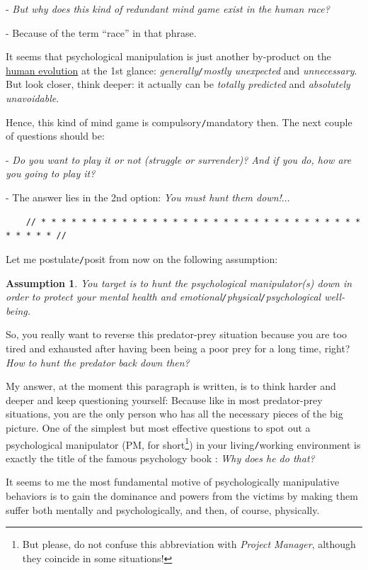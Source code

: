 \documentclass[12pt]{article}
\newtheorem{assumption}{Assumption}
\begin{document}
- {\it But why does this kind of redundant mind game exist in the human race?}

- Because of the term ``race'' in that phrase.

It seems that psychological manipulation is just another by-product on the \href{https://en.wikipedia.org/wiki/Human_evolution}{human evolution} at the 1st glance: {\it generally{\tt/}mostly unexpected} and {\it unnecessary}. But look closer, think deeper: it actually can be {\it totally predicted} and {\it absolutely unavoidable}.

Hence, this kind of mind game is compulsory{\tt/}mandatory then. The next couple of questions should be:

- {\it Do you want to play it or not (struggle or surrender)? And if you do, how are you going to play it?}

- The answer lies in the 2nd option: {\it You must hunt them down!$\ldots$}

\begin{verbatim}
	// * * * * * * * * * * * * * * * * * * * * * * * * * * * * * * * * * * * * * //
\end{verbatim}

\noindent
{} Let me postulate{\tt/}posit from now on the following assumption:

\begin{assumption}
	You target is to hunt the psychological manipulator(s) down in order to protect your mental health and emotional{\tt/}physical{\tt/}psychological well-being.
\end{assumption}
So, you really want to reverse this predator-prey situation because you are too tired and exhausted after having been being a poor prey for a long time, right? {\it How to hunt the predator back down then?}

My answer, at the moment this paragraph is written, is to think harder and deeper and keep questioning yourself: Because like in most predator-prey situations, you are the only person who has all the necessary pieces of the big picture. One of the simplest but most effective questions to spot out a psychological manipulator (PM, for short\footnote{But please, do not confuse this abbreviation with {\it Project Manager}, although they coincide in some situations!}) in your living{\tt/}working environment is exactly the title of the famous psychology book \cite{Bancroft2003}: {\it Why does he do that?}

It seems to me the most fundamental motive of psychologically manipulative behaviors is to gain the dominance and powers from the victims by making them suffer both mentally and psychologically, and then, of course, physically. 
\end{document}
